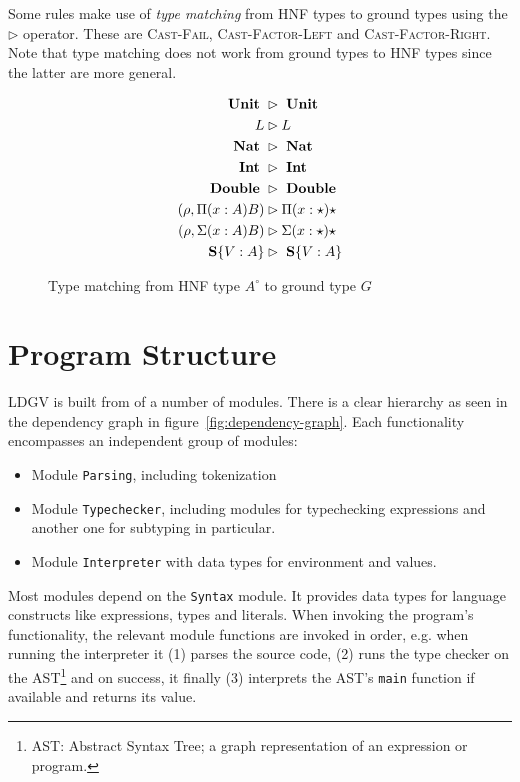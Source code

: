 Some rules make use of \emph{type matching} from HNF types to ground types using the $\rhd$ operator. These are \textsc{Cast-Fail}, \textsc{Cast-Factor-Left} and \textsc{Cast-Factor-Right}. Note that type matching does not work from ground types to HNF types since the latter are more general.

\begin{figure}
\begin{align*}
\text{ \textbf{Unit} } &\rhd \text{ \textbf{Unit} } \\
L &\rhd L \\
\text{ \textbf{Nat} } &\rhd \text{ \textbf{Nat} } \\
\text{ \textbf{Int} } &\rhd \text{ \textbf{Int} } \\
\text{ \textbf{Double} } &\rhd \text{ \textbf{Double} } \\
(\rho, \Pi (x:A)B) &\rhd \Pi(x:\star)\star \\
(\rho, \Sigma (x:A)B) &\rhd \Sigma(x:\star)\star \\
\text{ \textbf{S}} \{ V:A \} &\rhd \text{ \textbf{S}} \{ V : A \}
\end{align*}
\caption{Type matching from HNF type $A^\circ$ to ground type $G$}
\label{fig:ccldlc-type-matching}
\end{figure}

\section{Program Structure}\label{sec:program-structure}

LDGV is built from of a number of modules. There is a clear hierarchy as seen in the dependency graph in figure~\ref{fig:dependency-graph}. Each functionality encompasses an independent group of modules:

\begin{itemize}
 \item Module \texttt{Parsing}, including tokenization
 \item Module \texttt{Typechecker}, including modules for typechecking expressions and another one for subtyping in particular.
 \item Module \texttt{Interpreter} with data types for environment and values.
\end{itemize}

Most modules depend on the \texttt{Syntax} module. It provides data types for language constructs like expressions, types and literals. When invoking the program's functionality, the relevant module functions are invoked in order, e.g. when running the interpreter it (1) parses the source code, (2) runs the type checker on the AST\footnote{AST: Abstract Syntax Tree; a graph representation of an expression or program.} and on success, it finally (3) interprets the AST's \texttt{main} function if available and returns its value. 

